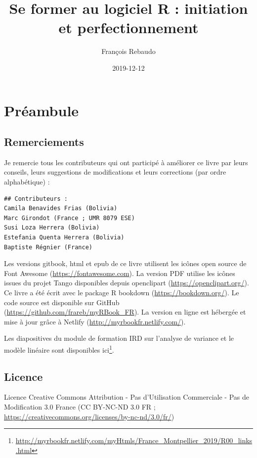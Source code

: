 \documentclass[]{book}
\title{Se former au logiciel R : initiation et perfectionnement}
\author{François Rebaudo}
\date{2019-12-12}
\let\rmarkdownfootnote\footnote%
\def\footnote{\protect\rmarkdownfootnote}
\renewcommand{\href}[2]{#2\footnote{\url{#1}}}
\begin{document}
\maketitle

{
\setcounter{tocdepth}{1}
\tableofcontents
}
\hypertarget{preambule}{%
\chapter{Préambule}\label{preambule}}

\hypertarget{remerciements}{%
\section{Remerciements}\label{remerciements}}

Je remercie tous les contributeurs qui ont participé à améliorer ce livre par leurs conseils, leurs suggestions de modifications et leurs corrections (par ordre alphabétique) :

\begin{verbatim}
## Contributeurs :
Camila Benavides Frias (Bolivia)
Marc Girondot (France ; UMR 8079 ESE)
Susi Loza Herrera (Bolivia)
Estefania Quenta Herrera (Bolivia)
Baptiste Régnier (France)
\end{verbatim}

Les versions gitbook, html et epub de ce livre utilisent les icônes open source de Font Awesome (\url{https://fontawesome.com}). La version PDF utilise les icônes issues du projet Tango disponibles depuis openclipart (\url{https://openclipart.org/}). Ce livre a été écrit avec le package R bookdown (\url{https://bookdown.org/}). Le code source est disponible sur GitHub (\url{https://github.com/frareb/myRBook_FR}). La version en ligne est hébergée et mise à jour grâce à Netlify (\url{http://myrbookfr.netlify.com/}).

Les diapositives du \href{http://myrbookfr.netlify.com/myHtmls/France_Montpellier_2019/R00_links.html}{module de formation IRD sur l'analyse de variance et le modèle linéaire sont disponibles ici}.

\hypertarget{licence}{%
\section{Licence}\label{licence}}

Licence Creative Commons Attribution - Pas d'Utilisation Commerciale - Pas de Modification 3.0 France (CC BY-NC-ND 3.0 FR ; \url{https://creativecommons.org/licenses/by-nc-nd/3.0/fr/})
\end{document}
